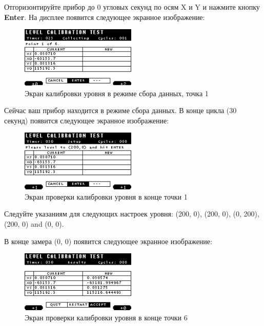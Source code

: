 Отгоризонтируйте прибор \cg{} до 0 угловых секунд по осям X и Y и нажмите
кнопку \textbf{Enter}. На дисплее появится следующее экранное изображение:

\newpage
\begin{figure}[H]
  \centering
  \includegraphics[width=0.49\textwidth]{figures/the_level_calibration_test_screen_in_collecting_mode_point_1}
  \caption{Экран калибровки уровня в режиме сбора данных, точка 1}
  \label{fig:the_level_calibration_test_screen_in_collecting_mode_point_1}
\end{figure}

Сейчас ваш прибор \cg{} находится в режиме сбора данных. В конце цикла (30 секунд)
появится следующее экранное изображение:

\begin{figure}[H]
  \centering
  \includegraphics[width=0.49\textwidth]{figures/the_level_calibration_test_screen_at_the_end_of_the_point_1}
  \caption{Экран проверки калибровки уровня в конце точки 1}
  \label{fig:the_level_calibration_test_screen_at_the_end_of_the_point_1}
\end{figure}

Следуйте указаниям для следующих настроек уровня: (200, 0), (\textminus{}200,
0), (0, 200), (\textminus{}200, 0) and (0, 0).

В конце замера (0, 0) появится следующее экранное изображение:

\begin{figure}[H]
  \centering
  \includegraphics[width=0.49\textwidth]{figures/the_level_clibration_test_screen_at_the_end_of_point_6}
  \caption{Экран проверки калибровки уровня в конце точки 6}
  \label{fig:the_level_clibration_test_screen_at_the_end_of_point_6}
\end{figure}

